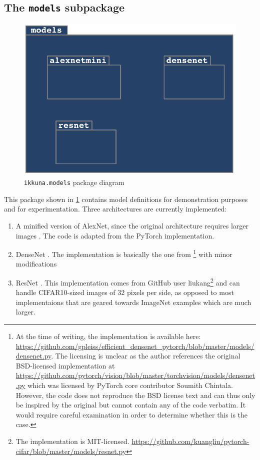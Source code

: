 \hypertarget{sec:pack-models}{%
\subsection{The \texttt{models} subpackage}\label{sec:pack-models}}

\begin{figure}
    \hypertarget{fig:pack-diag-models}{%
        \centering
        \includegraphics[max width=.5\textwidth]{gfx/diagrams/class_diagrams/models_package_diagram.pdf}
        \caption{\texttt{ikkuna.models} package diagram}\label{fig:pack-diag-models}
    }
\end{figure}

This package shown in \cref{fig:pack-diag-models} contains model
definitions for demonstration purposes and for experimentation. Three
architectures are currently implemented:

\begin{enumerate}
    \item
        A minified version of AlexNet, since the original architecture
        requires larger images \citep{krizhevsky2012imagenet}. The
        code is adapted from the PyTorch implementation.
    \item
        DenseNet \citep{huang2017densely}. The implementation is basically the
        one from \citep{pleiss2017memory}\footnote{At the time of writing, the
            implementation is available here:
            \url{https://github.com/gpleiss/efficient_densenet_pytorch/blob/master/models/densenet.py}.
            The licensing is unclear as the author references the original
            BSD-licensed implementation at
            \url{https://github.com/pytorch/vision/blob/master/torchvision/models/densenet.py}
            which was licensed by PyTorch core contributor Soumith Chintala.
            However, the code does not reproduce the BSD license text and can
            thus only be inspired by the original but cannot contain any of the
        code verbatim. It would require careful examination in order to
    determine whether this is the case.} with minor modifications
    \item
        ResNet \citep{he2016deep}. This implementation comes from
        GitHub user liukang\footnote{The implementation is MIT-licensed.
        \url{https://github.com/kuangliu/pytorch-cifar/blob/master/models/resnet.py}}
        and can handle CIFAR10-sized images of 32 pixels per side, as opposed
        to most implementaions that are geared towards ImageNet examples which
        are much larger.
\end{enumerate}

